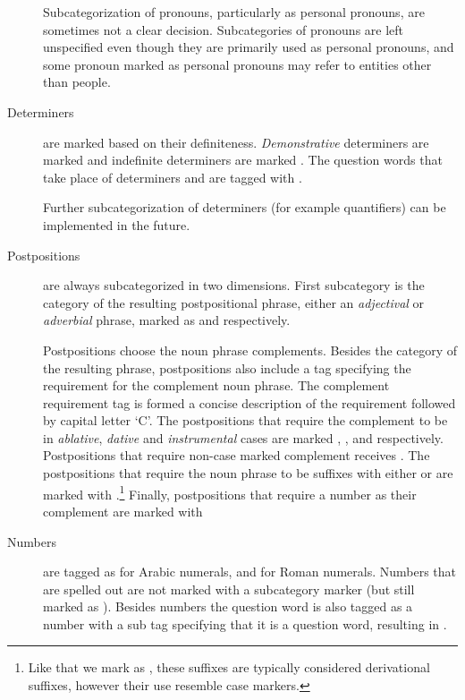 \documentclass[twocolumn]{article}
\begin{document}
\begin{description}
Subcategorization of pronouns, particularly as personal pronouns, are
sometimes not a clear decision. Subcategories of pronouns are left
unspecified even though they are primarily used as personal pronouns,
and some pronoun marked as personal pronouns may refer to entities
other than people.

\item[Determiners] are marked based on their definiteness. 
\emph{Demonstrative} determiners are marked  and
indefinite determiners are marked . The question
words that take place of determiners  and
 are tagged with . 

Further subcategorization of determiners (for example 
quantifiers) can be implemented in the future.

\item[Postpositions] are always subcategorized in two dimensions.
First subcategory is the category of the resulting postpositional
phrase, either an \emph{adjectival} or \emph{adverbial} phrase, marked
as  and  respectively.

Postpositions choose the noun phrase complements.
Besides the category of the resulting phrase, postpositions also
include a tag specifying the requirement for the complement noun
phrase. The complement requirement tag is formed a concise description of the
requirement followed by capital letter `C'. The postpositions that require 
the complement to be in \emph{ablative}, \emph{dative} and
\emph{instrumental} cases are marked 
,
,
and  respectively. Postpositions that require
non-case marked complement receives . The
postpositions that require the noun phrase to be suffixes with either
 or  are marked with
.\footnote{Like  that we mark as
, these suffixes are typically considered derivational suffixes, 
however their use resemble case markers.}
Finally, postpositions that require a number as their complement are
marked with 

\item[Numbers] are tagged as  for Arabic numerals,
and  for Roman numerals. Numbers that are spelled
out are not marked with a subcategory marker (but still marked as
). Besides numbers the question word 
is also tagged as a number with a sub tag specifying that it is a
question word, resulting in .


\end{description}
\end{document}
